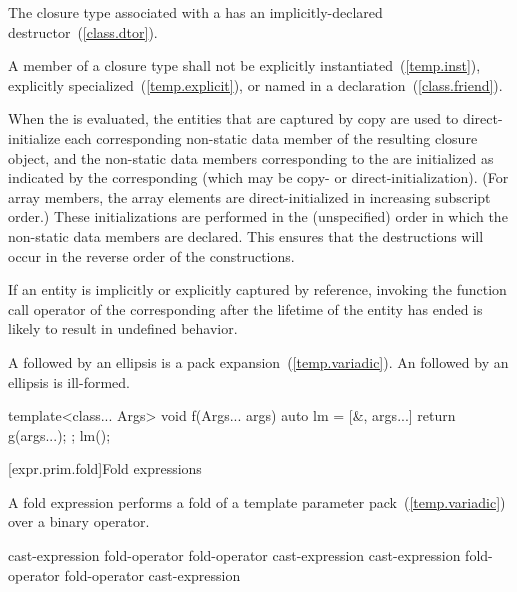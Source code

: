 \pnum
The closure type associated with a  has an
implicitly-declared destructor~(\ref{class.dtor}).

\pnum
A member of a closure type shall not be
explicitly instantiated~(\ref{temp.inst}),
explicitly specialized~(\ref{temp.explicit}), or
named in a  declaration~(\ref{class.friend}).

\pnum
When the  is evaluated, the entities that are
captured by copy are used to direct-initialize each corresponding non-static data member
of the resulting closure object, and the non-static data members corresponding to the
 are initialized as indicated by the corresponding
 (which may be copy- or direct-initialization). (For array members, the array elements are
direct-initialized in increasing subscript order.) These initializations are performed
in the (unspecified) order in which the non-static data members are declared. \enternote
This ensures that the destructions will occur in the reverse order of the constructions.
\exitnote

\pnum
\enternote If an entity is implicitly or explicitly captured by reference,
invoking the function call operator of the corresponding 
after the lifetime of the entity has ended is likely to result in undefined behavior.
\exitnote

\pnum
A  followed by an ellipsis is a pack
expansion~(\ref{temp.variadic}). An  followed by an
ellipsis is ill-formed.
\enterexample
\begin{codeblock}
template<class... Args>
void f(Args... args) {
  auto lm = [&, args...] { return g(args...); };
  lm();
}
\end{codeblock}
\exitexample%
%

[expr.prim.fold]{Fold expressions}%

\pnum
A fold expression performs a fold of a template parameter
pack~(\ref{temp.variadic}) over a binary operator.

\begin{bnf}
\br
    \terminal{(} cast-expression fold-operator  \terminal{)}\br
    \terminal{(}  fold-operator cast-expression \terminal{)}\br
    \terminal{(} cast-expression fold-operator  fold-operator cast-expression \terminal{)}
\end{bnf}

